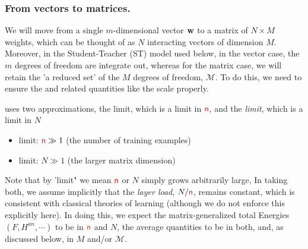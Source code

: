 \subsubsection{From vectors to matrices.} 
We will move from a single $m$-dimensional \Perceptron vector ${\mathbf{w}}$ 
to a matrix of $N \times M$ weights, which can be thought of
as $N$ interacting vectors of dimension $M$.
Moreover, in the Student-Teacher (ST) model used below,
in the vector case, the $m$ degrees of freedom are integrate out,
whereas for the matrix case, we will retain the 'a reduced set' of the  $M$ degrees of freedom, $\mathcal{M}$.  To do this, we need to ensure the \FreeEnergies and related quantities like the \AverageLayerQualitySquared scale properly.

\SETOL uses two \LargeN approximations, the \Thermodynamic limit, which is a \LargeN limit in ${\color{red}\sf{n}}$, and the \emph{\WideLayer limit}, which is a \LargeN limit in $N$ 
\begin{itemize}
    \item \Thermodynamic limit: ${\color{red}\sf{n}}\gg 1$ (the number of training examples)
    \item \WideLayer limit: $N\gg 1$ (the larger matrix dimension)
\end{itemize}
Note that by 'limit" we mean ${\color{red}\sf{n}}$ or $N$ simply grows arbitrarily large,  In taking both, we assume implicitly that the \emph{layer load}, $N/{\color{red}\sf{n}}$, remains constant, which is consistent with classical \STATMECH theories of learning\cite{MM17_TR} (although we do not enforce this explicitly here).  
In doing this, we expect the matrix-generalized total Energies $(F, H^{an}, \cdots)$ to be \SizeExtensive in ${\color{red}\sf{n}}$ and $N$,  the average quantities to be \SizeIntensive in both, 
and, as discussed below, \emph{\SizeConsistent} in $M$ and/or $\mathcal{M}$.

